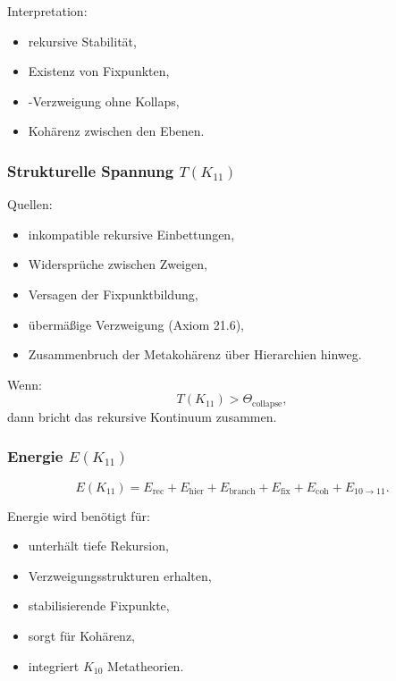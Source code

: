 Interpretation:
\begin{itemize}
    \item rekursive Stabilität,
    \item Existenz von Fixpunkten,
    \item-Verzweigung ohne Kollaps,
    \item Kohärenz zwischen den Ebenen.
\end{itemize}

\subsubsection{Strukturelle Spannung $T(K_{11})$}

Quellen:
\begin{itemize}
    \item inkompatible rekursive Einbettungen,
    \item Widersprüche zwischen Zweigen,
    \item Versagen der Fixpunktbildung,
    \item übermäßige Verzweigung (Axiom 21.6),
    \item Zusammenbruch der Metakohärenz über Hierarchien hinweg.
\end{itemize}

Wenn:
\[
T(K_{11}) > \Theta_{\mathrm{collapse}},
\]
dann bricht das rekursive Kontinuum zusammen.

\subsubsection{Energie $E(K_{11})$}

\[
E(K_{11})=
E_{\mathrm{rec}}+
E_{\mathrm{hier}}+
E_{\mathrm{branch}}+
E_{\mathrm{fix}}+
E_{\mathrm{coh}}+
E_{10\to11}.
\]

Energie wird benötigt für:
\begin{itemize}
    \item unterhält tiefe Rekursion,
    \item Verzweigungsstrukturen erhalten,
    \item stabilisierende Fixpunkte,
    \item sorgt für Kohärenz,
    \item integriert $K_{10}$ Metatheorien.
\end{itemize}

